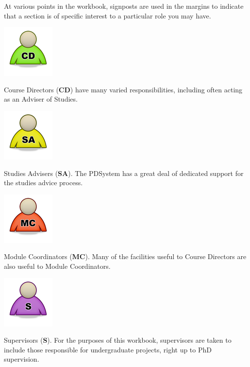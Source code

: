 \documentclass[12 pt]{book}
\begin{document}
At various points in the workbook, signposts are used in
the margins to indicate that a section is of specific
interest to a particular role you may have.

\parbox{2 cm}{\includegraphics{png/icon_cd.png}}
\parbox{9 cm}{Course Directors ({\bfseries CD}) have many varied responsibilities,
including often acting as an Adviser of Studies.}
\medskip

\parbox{2 cm}{\includegraphics{png/icon_sa.png}}
\parbox{9 cm}{Studies Advisers ({\bfseries SA}). The PDSystem has a great deal of
dedicated support for the studies advice process.}
\medskip

\parbox{2 cm}{\includegraphics{png/icon_mc.png}}
\parbox{9 cm}{Module Coordinators ({\bfseries MC}). Many
of the facilities useful to Course Directors are also
useful to Module Coordinators.}
\medskip

\parbox{2 cm}{\includegraphics{png/icon_s.png}}
\parbox{9 cm}{Supervisors ({\bfseries S}). For the purposes
of this workbook, supervisors are taken to include those
responsible for undergraduate projects, right up to PhD
supervision.}
\medskip
\end{document}
